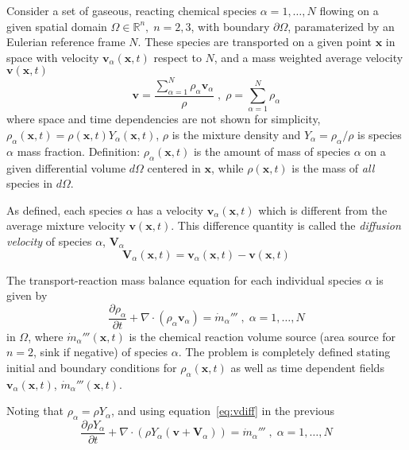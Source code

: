 \documentclass[12pt]{article}
\begin{document}
Consider a set of gaseous, reacting  chemical species $\alpha=1,\dots,N$ flowing on a given spatial domain $\Omega \in \mathbb{R}^n, \; n=2,3$, with boundary $\partial \Omega$, paramaterized by an Eulerian reference frame $N$. These species are transported on a given point $\mathbf{x}$ in space with velocity $\mathbf{v}_\alpha(\mathbf{x},t)$ respect to $N$, and a mass weighted average velocity $\mathbf{v}(\mathbf{x},t)$
%
\begin{equation}
  \mathbf{v} = \frac{ \sum\limits_{\alpha=1}^{N} {\rho_\alpha \mathbf{v}_\alpha}}{\rho} \; , \; \rho =  \sum\limits_{\alpha=1}^{N} {\rho_\alpha} \label{eq:veldens}
\end{equation}
%
where space and time dependencies are not shown for simplicity, $\rho_\alpha(\mathbf{x},t) = \rho(\mathbf{x},t) Y_\alpha (\mathbf{x},t)$, $\rho$ is the mixture density and $Y_\alpha = \rho_\alpha / \rho$ is species $\alpha$ mass fraction. Definition: $\rho_\alpha(\mathbf{x},t)$ is the amount of mass of species $\alpha$ on a given differential volume $d\Omega$ centered in $\mathbf{x}$, while  $\rho(\mathbf{x},t)$ is the mass of \textit{all} species in $d\Omega$.

As defined, each species $\alpha$ has a velocity $\mathbf{v}_\alpha(\mathbf{x},t)$ which is different from the average mixture velocity $\mathbf{v}(\mathbf{x},t)$. This difference quantity is called the \textit{diffusion velocity} of species $\alpha$, $\mathbf{V}_\alpha$
%
\begin{equation}
   \mathbf{V}_\alpha(\mathbf{x},t) = \mathbf{v}_\alpha(\mathbf{x},t) - \mathbf{v}(\mathbf{x},t) \label{eq:vdiff}
\end{equation}
%

The transport-reaction mass balance equation for each individual species $\alpha$ is given by
%
\begin{equation}
   \frac{\partial \rho_\alpha}{ \partial t} + \nabla \cdot (\rho_\alpha  \mathbf{v}_\alpha) = \dot{m}_\alpha''' \; , \; \alpha=1,\dots,N \label{eq:bal}
\end{equation}
%
in $\Omega$, where $\dot{m}_\alpha'''(\mathbf{x},t)$ is the chemical reaction volume source (area source for $n=2$, sink if negative) of species $\alpha$. The problem is completely defined stating initial and boundary conditions for $\rho_\alpha(\mathbf{x},t)$ as well as time dependent fields $\mathbf{v}_\alpha(\mathbf{x},t)$, $\dot{m}_\alpha'''(\mathbf{x},t)$.

Noting that $ \rho_\alpha = \rho Y_\alpha$, and using equation~\eqref{eq:vdiff} in the previous
%
\begin{equation}
   \frac{\partial \rho Y_\alpha}{ \partial t} + \nabla \cdot \left( \rho Y_\alpha  (\mathbf{v}+\mathbf{V}_\alpha) \right) = \dot{m}_\alpha''' \; , \; \alpha=1,\dots,N \label{eq:bal2}
\end{equation}
%
\end{document}
